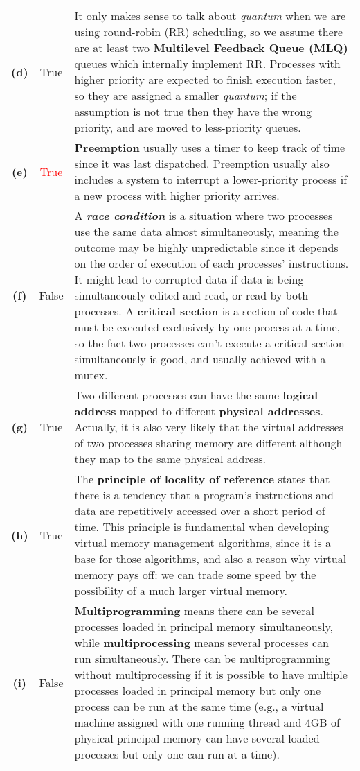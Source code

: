\documentclass{sope}
\begin{document}
{\begin{center}
\begin{longtable}{c | c p{132mm}}
        \textbf{(d)} & True & It only makes sense to talk about \emph{quantum} when we are using round-robin (RR) scheduling, so we assume there are at least two \textbf{Multilevel Feedback Queue (MLQ)} queues which internally implement RR. Processes with higher priority are expected to finish execution faster, so they are assigned a smaller \emph{quantum}; if the assumption is not true then they have the wrong priority, and are moved to less-priority queues. \\
        \textbf{(e)} & \textcolor{red}{True} & \textbf{Preemption} usually uses a timer to keep track of time since it was last dispatched. Preemption usually also includes a system to interrupt a lower-priority process if a new process with higher priority arrives. \\
        \textbf{(f)} & False & A \textbf{\emph{race condition}} is a situation where two processes use the same data almost simultaneously, meaning the outcome may be highly unpredictable since it depends on the order of execution of each processes' instructions. It might lead to corrupted data if data is being simultaneously edited and read, or read by both processes. A \textbf{critical section} is a section of code that must be executed exclusively by one process at a time, so the fact two processes can't execute a critical section simultaneously is good, and usually achieved with a mutex. \\
        \textbf{(g)} & True & Two different processes can have the same \textbf{logical address} mapped to different \textbf{physical addresses}. Actually, it is also very likely that the virtual addresses of two processes sharing memory are different although they map to the same physical address. \\
        \textbf{(h)} & True & The \textbf{principle of locality of reference} states that there is a tendency that a program's instructions and data are repetitively accessed over a short period of time. This principle is fundamental when developing virtual memory management algorithms, since it is a base for those algorithms, and also a reason why virtual memory pays off: we can trade some speed by the possibility of a much larger virtual memory. \\
        \textbf{(i)} & False & \textbf{Multiprogramming} means there can be several processes loaded in principal memory simultaneously, while \textbf{multiprocessing} means several processes can run simultaneously. There can be multiprogramming without multiprocessing if it is possible to have multiple processes loaded in principal memory but only one process can be run at the same time (e.g., a virtual machine assigned with one running thread and 4GB of physical principal memory can have several loaded processes but only one can run at a time). \\

\end{longtable}
\end{center}}
\end{document}
